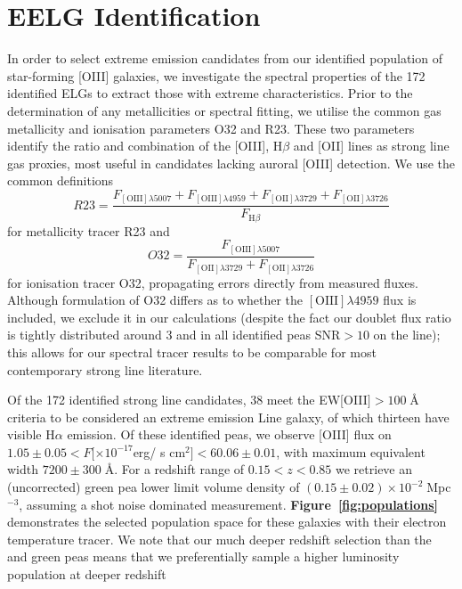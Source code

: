 \documentclass[fleqn,usenatbib]{mnras}
\begin{document}
\section{EELG Identification}
\label{sec:pop}

In order to select extreme emission candidates from our identified population of star-forming [OIII] galaxies, we investigate the spectral properties of the 172 identified ELGs to extract those with extreme characteristics. Prior to the determination of any metallicities or spectral fitting, we utilise the common gas metallicity and ionisation parameters O32 and R23. These two parameters identify the ratio and combination of the [OIII], H$\beta$ and [OII] lines as strong line gas proxies, most useful in candidates lacking auroral [OIII] detection. We use the common definitions
\begin{equation}
R23 = \frac{F_{\mathrm{[OIII]}\lambda5007}+ F_{\mathrm{[OIII]}\lambda4959}+ F_{\mathrm{[OII]}\lambda3729}+ F_{\mathrm{[OII]}\lambda3726}}{ F_{\mathrm{H}\beta} }
\end{equation}
for metallicity tracer R23 and 
\begin{equation}
O32 = \frac{F_{\mathrm{[OIII]}\lambda5007}}{ F_{\mathrm{[OII]}\lambda3729}+ F_{\mathrm{[OII]}\lambda3726}}
\end{equation}
for ionisation tracer O32, propagating errors directly from measured fluxes. Although formulation of O32 differs as to whether the $\mathrm{[OIII]}\lambda4959$ flux is included, we exclude it in our calculations (despite the fact our doublet flux ratio is tightly distributed around 3 and in all identified peas SNR$>10$ on the line); this allows for our spectral tracer results to be comparable for most contemporary strong line literature.

Of the 172 identified strong line candidates, 38 meet the EW[OIII$]>100\;$\AA$\;$ criteria to be considered an extreme emission Line galaxy, of which thirteen have visible H$\alpha$ emission. Of these identified peas, we observe [OIII] flux on $1.05\pm0.05<F [\times10^{-17}$erg/ s cm$^2$$] <60.06\pm0.01$, with maximum equivalent width $7200\pm300\;$\AA. For a redshift range of $0.15<z<0.85$ we retrieve an (uncorrected) green pea lower limit volume density of $(0.15 \pm 0.02) \times 10^{-2}\;$Mpc$^{-3}$, assuming a shot noise dominated measurement. \textbf{Figure~\ref{fig:populations}} demonstrates the selected population space for these galaxies with their electron temperature tracer. We note that our much deeper redshift selection than the \cite{cardamone} and \cite{jiang} green peas means that we preferentially sample a higher luminosity population at deeper redshift
\end{document}
